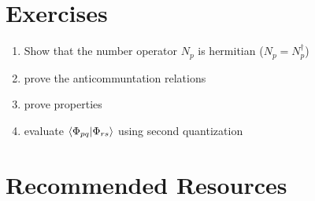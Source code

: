 \documentclass{article}
\begin{document}
\begin{comment}
Types of problems:
1. Slater's rules
2. 


Types of ways to solve:
1. First quantization
2. 2nd quantization in the true vacuum without Wick's theorem
3. 2nd quantization in the true vacuum with Wick's theorem
4. PH formalism with Wick's theorem 
5. PH formalism with Wick's theorem and $\Phi$-normal ordered Hamiltonian

\end{comment}

\section{Exercises}
\begin{enumerate}
\item Show that the number operator $N_p$ is hermitian ($N_p = N_p^\dagger$)
\item prove the anticommuntation relations
\item prove properties 
\item evaluate $\braket{\Phi_{pq} | \Phi_{rs}}$ using second quantization
\end{enumerate}

\section{Recommended Resources}
\end{document}
